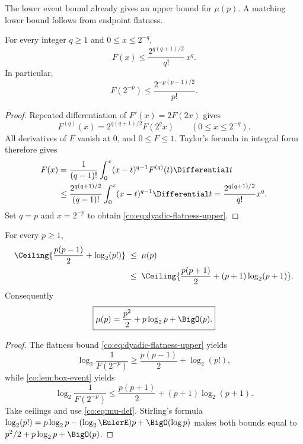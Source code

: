 The lower event bound already gives an upper bound for $\mu(p)$.  A matching
lower bound follows from endpoint flatness.

\begin{lemma}\label{co:lem:flatness-upper}
For every integer $q\ge1$ and $0\le x\le2^{-q}$,
\begin{equation}\label{co:eq:flatness-upper}
 F(x)\le\frac{2^{q(q+1)/2}}{q!}\,x^q.
\end{equation}
In particular,
\begin{equation}\label{co:eq:dyadic-flatness-upper}
 F(2^{-p})\le\frac{2^{-p(p-1)/2}}{p!}.
\end{equation}
\end{lemma}

\begin{proof}
Repeated differentiation of $F'(x)=2F(2x)$ gives
\begin{equation}\label{co:eq:iterated-derivative}
 F^{(q)}(x)=2^{q(q+1)/2}F(2^qx)
 \qquad(0\le x\le2^{-q}).
\end{equation}
All derivatives of $F$ vanish at $0$, and $0\le F\le1$.  Taylor's formula in
integral form therefore gives
\begin{align*}
 F(x)
 &=\frac1{(q-1)!}\int_0^x(x-t)^{q-1}F^{(q)}(t)\Differential t\\
 &\le\frac{2^{q(q+1)/2}}{(q-1)!}
      \int_0^x(x-t)^{q-1}\Differential t
 =\frac{2^{q(q+1)/2}}{q!}x^q.
\end{align*}
Set $q=p$ and $x=2^{-p}$ to obtain
\eqref{co:eq:dyadic-flatness-upper}.
\end{proof}

\begin{theorem}\label{co:thm:mu-asymptotic}
For every $p\ge1$,
\begin{align}
 \Ceiling{\frac{p(p-1)}2+\log_2(p!)}
 \;&\le\;\mu(p)\label{co:eq:mu-lower}\\
 &\le\;
 \Ceiling{\frac{p(p+1)}2+(p+1)\log_2(p+1)}.
 \label{co:eq:mu-upper}
\end{align}
Consequently
\begin{equation}\label{co:eq:mu-asymptotic}
 \boxed{\displaystyle
 \mu(p)=\frac{p^2}{2}+p\log_2p+\BigO(p).}
\end{equation}
\end{theorem}

\begin{proof}
The flatness bound \eqref{co:eq:dyadic-flatness-upper} yields
\[
 \log_2\frac1{F(2^{-p})}
 \ge\frac{p(p-1)}2+\log_2(p!),
\]
while \cref{co:lem:box-event} yields
\[
 \log_2\frac1{F(2^{-p})}
 \le\frac{p(p+1)}2+(p+1)\log_2(p+1).
\]
Take ceilings and use \eqref{co:eq:mu-def}.  Stirling's formula
$\log_2(p!)=p\log_2p-(\log_2\EulerE)p+\BigO(\log p)$ makes both bounds equal to
$p^2/2+p\log_2p+\BigO(p)$.
\end{proof}


